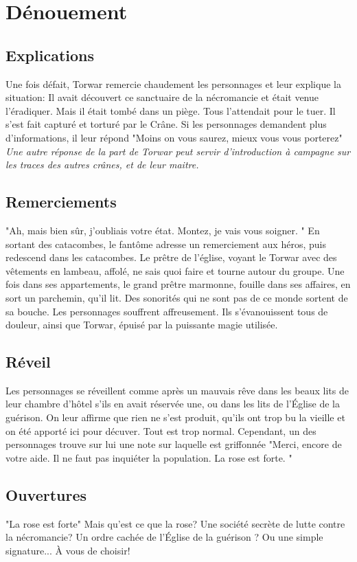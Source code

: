 \documentclass[a4paper, 11pt]{article}
\begin{document}
\section{Dénouement} 
\subsection{Explications}
Une fois défait, Torwar remercie chaudement les personnages et leur explique la situation: Il avait découvert ce sanctuaire de la nécromancie et était venue l'éradiquer. Mais il était tombé dans un piège. Tous l'attendait pour le tuer. Il s'est fait capturé et torturé par le Crâne. Si les personnages demandent plus d'informations, il leur répond "Moins on vous saurez, mieux vous vous porterez" \textit{Une autre réponse de la part de Torwar peut servir d'introduction à campagne sur les traces des autres crânes, et de leur maitre.}

\subsection{Remerciements}
"Ah, mais bien sûr, j’oubliais votre état. Montez, je vais vous soigner. " En sortant des catacombes, le fantôme adresse un remerciement aux héros, puis redescend dans les catacombes.
Le prêtre de l'église, voyant le Torwar avec des vêtements en lambeau, affolé, ne sais quoi faire et tourne autour du groupe. Une fois dans ses appartements, le grand prêtre marmonne, fouille dans ses affaires, en sort un parchemin, qu'il lit. Des sonorités qui ne sont pas de ce monde sortent de sa bouche. Les personnages souffrent affreusement. Ils s’évanouissent tous de douleur, ainsi que Torwar, épuisé par la puissante magie utilisée. 

\subsection{Réveil}
Les personnages se réveillent comme après un mauvais rêve dans les beaux lits de leur chambre d'hôtel s'ils en avait réservée une, ou dans les lits de l’Église de la guérison. On leur affirme que rien ne s'est produit, qu'ils ont trop bu la vieille et on été apporté ici pour décuver. Tout est trop normal.
\newline
Cependant, un des personnages trouve sur lui une note sur laquelle est griffonnée "Merci, encore de votre aide. Il ne faut pas inquiéter la population. La rose est forte. "

\subsection{Ouvertures}
"La rose est forte" Mais qu'est ce que la rose? Une société secrète de lutte contre la nécromancie? Un ordre cachée de l'Église de la guérison ? Ou une simple signature... À vous de choisir!
\end{document}
